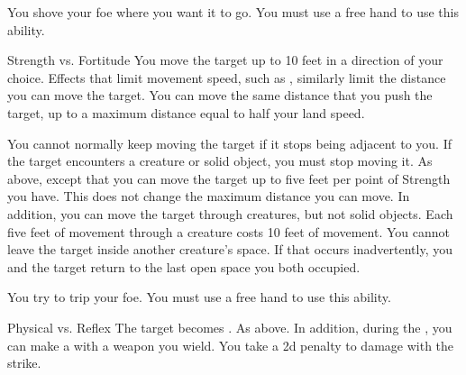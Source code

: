             \label{Shove} You shove your foe where you want it to go.
            You must use a free hand to use this ability.
            \begin{ability}
                \begin{spelltargetinginfo}
                \end{spelltargetinginfo}
                \begin{spelleffects}
                    \begin{spellattack}{Strength vs. Fortitude}
                        \spellsuccess You move the target up to 10 feet in a direction of your choice.
                        Effects that limit movement speed, such as , similarly limit the distance you can move the target.
                        You can move the same distance that you push the target, up to a maximum distance equal to half your land speed.

                        You cannot normally keep moving the target if it stops being adjacent to you.
                        If the target encounters a creature or solid object, you must stop moving it.
                        \spellcritical As above, except that you can move the target up to five feet per point of Strength you have.
                        This does not change the maximum distance you can move.
                        In addition, you can move the target through creatures, but not solid objects.
                        Each five feet of movement through a creature costs 10 feet of movement.
                        You cannot leave the target inside another creature's space.
                        If that occurs inadvertently, you and the target return to the last open space you both occupied.
                    \end{spellattack}
                \end{spelleffects}
            \end{ability}

            \label{Trip} You try to trip your foe.
            You must use a free hand to use this ability.
            \begin{ability}
                \begin{spelltargetinginfo}
                \end{spelltargetinginfo}
                \begin{spelleffects}
                    \begin{spellattack}{Physical vs. Reflex}
                        \spellsuccess The target becomes \prone.
                        \spellcritical As above.
                        In addition, during the , you can make a  with a weapon you wield.
                        You take a \minus2d penalty to damage with the strike.
                    \end{spellattack}
                \end{spelleffects}
            \end{ability}


